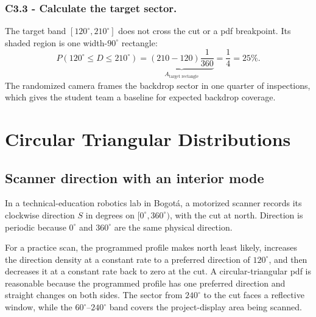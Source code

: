	\subsubsection*{C3.3 - Calculate the target sector.}
	\label{subsec:c3-uniform-device-c}
	The target band $[120^\circ,210^\circ]$ does not cross the cut or a pdf
	breakpoint.  Its shaded region is one width-$90^\circ$ rectangle:
	\[
	P(120^\circ\le D\le210^\circ)
	=\underbrace{(210-120)\frac1{360}}_{A_{\text{target rectangle}}}
	=\frac14=25\%.
	\]
	The randomized camera frames the backdrop sector in one quarter of inspections,
	which gives the student team a baseline for expected backdrop coverage.
	\begingroup
	\endgroup
	
	\section{Circular Triangular Distributions}\label{sec:c3-triangular}
	
	\subsection{Scanner direction with an interior mode}\label{sec:c3-triangular-scanner}
	In a technical-education robotics lab in Bogot\'a, a motorized scanner records
	its clockwise direction $S$ in degrees on $[0^\circ,360^\circ)$, with the cut at
	north.  Direction is periodic because $0^\circ$ and $360^\circ$ are the same
	physical direction.
	
	For a practice scan, the programmed profile makes north least likely, increases
	the direction density at a constant rate to a preferred direction of
	$120^\circ$, and then decreases it at a constant rate back to zero at the cut.
	A circular-triangular pdf is reasonable because the programmed profile has one
	preferred direction and straight changes on both sides.  The sector from
	$240^\circ$ to the cut faces a reflective window, while the
	$60^\circ$--$240^\circ$ band covers the project-display area being scanned.
	
